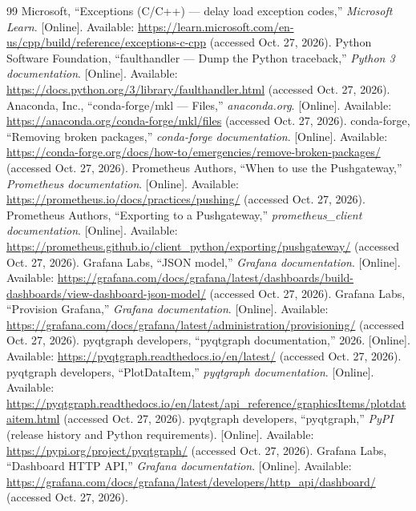 \documentclass[11pt,a4paper]{article}
\begin{document}
\begin{thebibliography}{99}
 Microsoft, ``Exceptions (C/C++) --- delay load exception codes,'' \emph{Microsoft Learn}. [Online]. Available: \url{https://learn.microsoft.com/en-us/cpp/build/reference/exceptions-c-cpp} (accessed Oct. 27, 2026).
 Python Software Foundation, ``faulthandler --- Dump the Python traceback,'' \emph{Python 3 documentation}. [Online]. Available: \url{https://docs.python.org/3/library/faulthandler.html} (accessed Oct. 27, 2026).
 Anaconda, Inc., ``conda-forge/mkl --- Files,'' \emph{anaconda.org}. [Online]. Available: \url{https://anaconda.org/conda-forge/mkl/files} (accessed Oct. 27, 2026).
 conda-forge, ``Removing broken packages,'' \emph{conda-forge documentation}. [Online]. Available: \url{https://conda-forge.org/docs/how-to/emergencies/remove-broken-packages/} (accessed Oct. 27, 2026).
 Prometheus Authors, ``When to use the Pushgateway,'' \emph{Prometheus documentation}. [Online]. Available: \url{https://prometheus.io/docs/practices/pushing/} (accessed Oct. 27, 2026).
 Prometheus Authors, ``Exporting to a Pushgateway,'' \emph{prometheus\_client documentation}. [Online]. Available: \url{https://prometheus.github.io/client_python/exporting/pushgateway/} (accessed Oct. 27, 2026).
 Grafana Labs, ``JSON model,'' \emph{Grafana documentation}. [Online]. Available: \url{https://grafana.com/docs/grafana/latest/dashboards/build-dashboards/view-dashboard-json-model/} (accessed Oct. 27, 2026).
 Grafana Labs, ``Provision Grafana,'' \emph{Grafana documentation}. [Online]. Available: \url{https://grafana.com/docs/grafana/latest/administration/provisioning/} (accessed Oct. 27, 2026).
 pyqtgraph developers, ``pyqtgraph documentation,'' 2026. [Online]. Available: \url{https://pyqtgraph.readthedocs.io/en/latest/} (accessed Oct. 27, 2026).
 pyqtgraph developers, ``PlotDataItem,'' \emph{pyqtgraph documentation}. [Online]. Available: \url{https://pyqtgraph.readthedocs.io/en/latest/api_reference/graphicsItems/plotdataitem.html} (accessed Oct. 27, 2026).
 pyqtgraph developers, ``pyqtgraph,'' \emph{PyPI} (release history and Python requirements). [Online]. Available: \url{https://pypi.org/project/pyqtgraph/} (accessed Oct. 27, 2026).
 Grafana Labs, ``Dashboard HTTP API,'' \emph{Grafana documentation}. [Online]. Available: \url{https://grafana.com/docs/grafana/latest/developers/http_api/dashboard/} (accessed Oct. 27, 2026).
\end{thebibliography}
\endgroup
\end{document}
